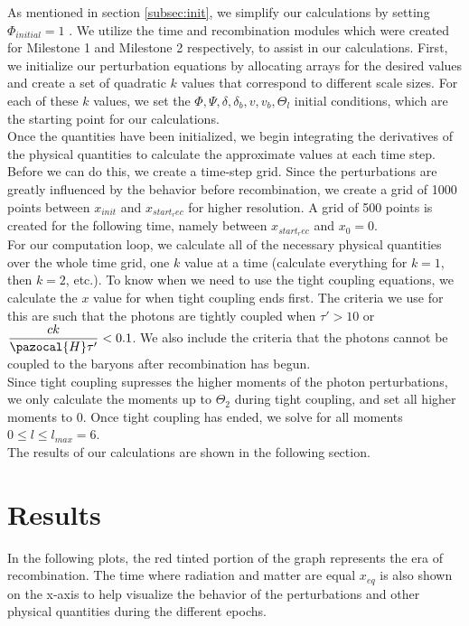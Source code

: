 \documentclass[a4paper]{article}
\begin{document}
As mentioned in section \ref{subsec:init}, we simplify our calculations by setting $\Phi_{initial} = 1$ . We utilize the time and recombination modules which were created for Milestone 1 and Milestone 2 respectively, to assist in our calculations.  First, we initialize our perturbation equations by allocating arrays for the desired values and create a set of quadratic $k$ values that correspond to different scale sizes. For each of these $k$ values, we set the $\Phi, \Psi, \delta, \delta_b, v, v_b, \Theta_l$ initial conditions, which are the starting point for our calculations. \\

Once the quantities have been initialized, we begin integrating the derivatives of the physical quantities to calculate the approximate values at each time step. Before we can do this, we create a time-step grid. Since the perturbations are greatly influenced by the behavior before recombination, we create a grid of 1000 points between $x_{init}$ and $x_{start_rec}$ for higher resolution. A grid of 500 points is created for the following time, namely between $x_{start_rec}$ and $x_0 = 0$.\\

For our computation loop, we calculate all of the necessary physical quantities over the whole time grid, one $k$ value at a time (calculate everything for $k=1$, then $k=2$, etc.). To know when we need to use the tight coupling equations, we calculate the $x$ value for when tight coupling ends first. The criteria we use for this are such that the photons are tightly coupled when $\tau' > 10$ or $\dfrac{ck}{\pazocal{H}\tau'} < 0.1$. We also include the criteria that the photons cannot be coupled to the baryons after recombination has begun. \\

Since tight coupling supresses the higher moments of the photon perturbations, we only calculate the moments up to $\Theta_2$ during tight coupling, and set all higher moments to 0. Once tight coupling has ended, we solve for all moments $0 \leq l \leq l_{max} = 6$.\\

The results of our calculations are shown in the following section.

\section{Results}\label{sec:results}
In the following plots, the red tinted portion of the graph represents the era of recombination. The time where radiation and matter are equal $x_{eq}$ is also shown on the x-axis to help visualize the behavior of the perturbations and other physical quantities during the different epochs.
\end{document}
